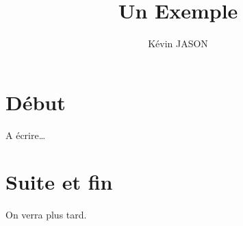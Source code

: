 \documentclass[a4paper,11pt]{article}
\author{Kévin JASON}
\title{Un Exemple}
\begin{document}
\maketitle
\tableofcontents
\section{Début}
A écrire\dots
\section{Suite et fin}
On verra plus tard.
\end{document}
